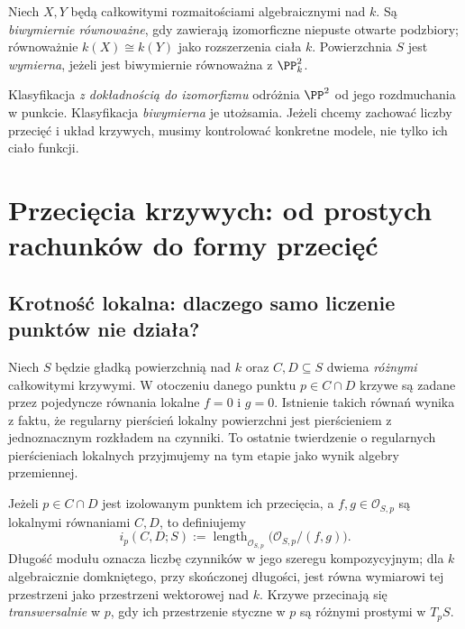 \begin{definicja}
Niech $X,Y$ będą całkowitymi rozmaitościami algebraicznymi nad $k$.
Są \emph{biwymiernie równoważne}, gdy zawierają izomorficzne
niepuste otwarte podzbiory; równoważnie $k(X)\cong k(Y)$ jako
rozszerzenia ciała $k$. Powierzchnia $S$ jest \emph{wymierna},
jeżeli jest biwymiernie równoważna z $\PP^2_k$.
\end{definicja}

\begin{uwaga}
Klasyfikacja \emph{z dokładnością do izomorfizmu} odróżnia
$\PP^2$ od jego rozdmuchania w punkcie. Klasyfikacja
\emph{biwymierna} je utożsamia. Jeżeli chcemy zachować
liczby przecięć i układ krzywych, musimy kontrolować
konkretne modele, nie tylko ich ciało funkcji.
\end{uwaga}

\section{Przecięcia krzywych: od prostych rachunków do formy przecięć}
\label{sec:ga6-intersections}

\subsection{Krotność lokalna: dlaczego samo liczenie punktów nie działa?}

Niech $S$ będzie gładką powierzchnią nad $k$ oraz $C,D\subseteq S$
dwiema \emph{różnymi} całkowitymi krzywymi. W otoczeniu danego
punktu $p\in C\cap D$ krzywe są zadane przez pojedyncze równania
lokalne $f=0$ i $g=0$. Istnienie takich równań wynika z faktu,
że regularny pierścień lokalny powierzchni jest pierścieniem
z jednoznacznym rozkładem na czynniki. To ostatnie twierdzenie
o regularnych pierścieniach lokalnych przyjmujemy na tym etapie
jako wynik algebry przemiennej.

\begin{definicja}
\label{def:ga6-intersection-local}
Jeżeli $p\in C\cap D$ jest izolowanym punktem ich przecięcia,
a $f,g\in\mathcal O_{S,p}$ są lokalnymi równaniami $C,D$,
to definiujemy
\[
 i_p(C,D;S):=\operatorname{length}_{\mathcal O_{S,p}}
   \bigl(\mathcal O_{S,p}/(f,g)\bigr).
\]
Długość modułu oznacza liczbę czynników w jego szeregu
kompozycyjnym; dla $k$ algebraicznie domkniętego, przy
skończonej długości, jest równa wymiarowi tej przestrzeni
jako przestrzeni wektorowej nad $k$. Krzywe przecinają się
\emph{transwersalnie} w $p$, gdy ich przestrzenie styczne w $p$
są różnymi prostymi w $T_pS$.
\end{definicja}

